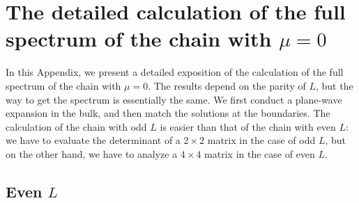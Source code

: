 \documentclass[aps, prb, showpacs, twocolumn, %
amssymb,superscriptaddress]{revtex4}
\begin{document}
\section{The detailed calculation of the full spectrum of the chain with $\mu=0$}
\label{sec:mu0 detail}

In this Appendix, we present a detailed exposition of the calculation of the full spectrum of the chain with $\mu=0$. The results depend on the parity of $L$, but the way to get the spectrum is essentially the same. We first conduct a plane-wave expansion in the bulk, and then match the solutions at the boundaries. The calculation of the chain with odd $L$ is easier than that of the chain with even $L$: we have to evaluate the determinant of a $2 \times 2$ matrix in the case of odd $L$, but on the other hand, we have to analyze a $4 \times 4$ matrix in the case of even $L$.


\subsection{Even $L$}
\label{sec:}
\end{document}

